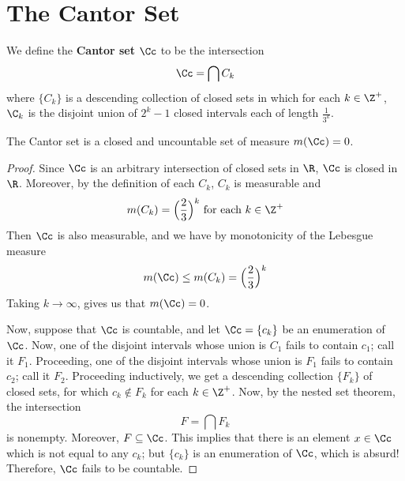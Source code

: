 \section{The Cantor Set}

\begin{definition}
    We define the \textbf{Cantor set} $\Cc$ to be the intersection
    \begin{equation*}
        \Cc=\bigcap{C_k}
    \end{equation*}
    where $\{C_k\}$ is a descending collection of closed sets in which for each
    $k \in \Z^+$,  $\C_k$ is the disjoint union of  $2^k-1$ closed intervals
    each of length  $\frac{1}{3^k}$.
\end{definition}

\begin{theorem}\label{8.7.1}
    The Cantor set is a closed and uncountable set of measure $m(\Cc)=0$.
\end{theorem}
\begin{proof}
    Since $\Cc$ is an arbitrary intersection of closed sets in  $\R$,  $\Cc$ is
    closed in  $\R$. Moreover, by the definition of each  $C_k$,  $C_k$ is
    measurable and
    \begin{equation*}
        m(C_k)=\Big{(} \frac{2}{3} \Big{)}^k \text{ for each } k \in \Z^+
    \end{equation*}
    Then $\Cc$ is also measurable, and we have by monotonicity of the Lebesgue
    measure
    \begin{equation*}
        m(\Cc) \leq m(C_k)=\Big{(} \frac{2}{3} \Big{)}^k
    \end{equation*}
    Taking $k \xrightarrow{} \infty$, gives us that $m(\Cc)=0$.

    Now, suppose that $\Cc$ is countable, and let $\Cc=\{c_k\}$ be an
    enumeration of $\Cc$. Now, one of the disjoint intervals whose union is
    $C_1$ fails to contain $c_1$; call it $F_1$. Proceeding, one of the disjoint
    intervals whose union is $F_1$ fails to contain $c_2$; call it $F_2$.
    Proceeding inductively, we get a descending collection $\{F_k\}$ of closed
    sets, for which $c_k \notin F_k$ for each  $k \in \Z^+$. Now, by the nested
    set theorem, the intersection
    \begin{equation*}
        F=\bigcap{F_k}
    \end{equation*}
    is nonempty. Moreover, $F \subseteq \Cc$. This implies that there is an
    element $x \in \Cc$ which is not equal to any $c_k$; but $\{c_k\}$ is an
    enumeration of $\Cc$, which is absurd! Therefore, $\Cc$ fails to be
    countable.
\end{proof}

